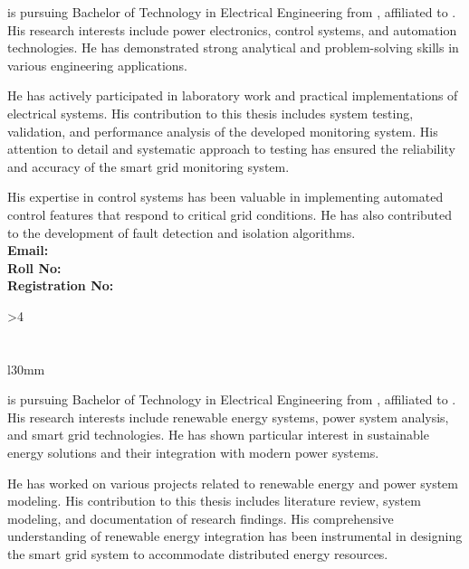 \textbf{\GetStudentFour} is pursuing Bachelor of Technology in Electrical Engineering from \GetCollege, affiliated to \GetUniversity. His research interests include power electronics, control systems, and automation technologies. He has demonstrated strong analytical and problem-solving skills in various engineering applications.

He has actively participated in laboratory work and practical implementations of electrical systems. His contribution to this thesis includes system testing, validation, and performance analysis of the developed monitoring system. His attention to detail and systematic approach to testing has ensured the reliability and accuracy of the smart grid monitoring system.

His expertise in control systems has been valuable in implementing automated control features that respond to critical grid conditions. He has also contributed to the development of fault detection and isolation algorithms.
\\
\noindent
\textbf{Email:} \GetEmailFour \quad\\ \textbf{Roll No:} \GetRollFour \quad \\ \textbf{Registration No:} \GetRegFour

\vspace{1cm}
\fi

\ifnum\GetNumberOfStudents>4\relax
\section*{\GetStudentFive}
\begin{wrapfigure}{l}{30mm}
	\vspace{-0.48cm}
\end{wrapfigure}
\justifying

\textbf{\GetStudentFive} is pursuing Bachelor of Technology in Electrical Engineering from \GetCollege, affiliated to \GetUniversity. His research interests include renewable energy systems, power system analysis, and smart grid technologies. He has shown particular interest in sustainable energy solutions and their integration with modern power systems.

He has worked on various projects related to renewable energy and power system modeling. His contribution to this thesis includes literature review, system modeling, and documentation of research findings. His comprehensive understanding of renewable energy integration has been instrumental in designing the smart grid system to accommodate distributed energy resources.


